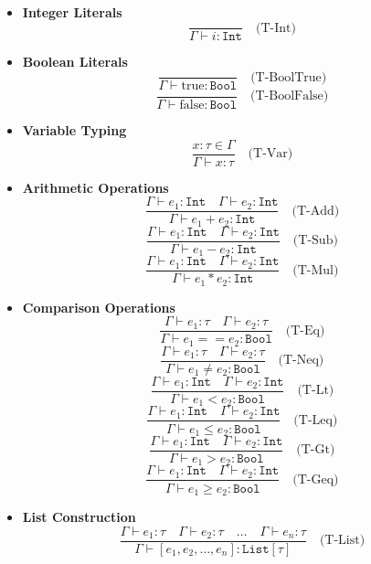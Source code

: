 \documentclass[letterpaper,12pt]{article}
\begin{document}
\begin{itemize}
    \item \textbf{Integer Literals}
    \[
    \frac{}{\Gamma \vdash i : \texttt{Int}} \quad \text{(T-Int)}
    \]
    
    \item \textbf{Boolean Literals}
    \[
    \frac{}{\Gamma \vdash \text{true} : \texttt{Bool}} \quad \text{(T-BoolTrue)}
    \]
    \[
    \frac{}{\Gamma \vdash \text{false} : \texttt{Bool}} \quad \text{(T-BoolFalse)}
    \]
    
    \item \textbf{Variable Typing}
    \[
    \frac{x : \tau \in \Gamma}{\Gamma \vdash x : \tau} \quad \text{(T-Var)}
    \]
    
    \item \textbf{Arithmetic Operations}
    \[
    \frac{\Gamma \vdash e_1 : \texttt{Int} \quad \Gamma \vdash e_2 : \texttt{Int}}{\Gamma \vdash e_1 + e_2 : \texttt{Int}} \quad \text{(T-Add)}
    \]
    \[
    \frac{\Gamma \vdash e_1 : \texttt{Int} \quad \Gamma \vdash e_2 : \texttt{Int}}{\Gamma \vdash e_1 - e_2 : \texttt{Int}} \quad \text{(T-Sub)}
    \]
    \[
    \frac{\Gamma \vdash e_1 : \texttt{Int} \quad \Gamma \vdash e_2 : \texttt{Int}}{\Gamma \vdash e_1 * e_2 : \texttt{Int}} \quad \text{(T-Mul)}
    \]
    
    \item \textbf{Comparison Operations}
    \[
    \frac{\Gamma \vdash e_1 : \tau \quad \Gamma \vdash e_2 : \tau}{\Gamma \vdash e_1 == e_2 : \texttt{Bool}} \quad \text{(T-Eq)}
    \]
    \[
    \frac{\Gamma \vdash e_1 : \tau \quad \Gamma \vdash e_2 : \tau}{\Gamma \vdash e_1 \ne e_2 : \texttt{Bool}} \quad \text{(T-Neq)}
    \]
    \[
    \frac{\Gamma \vdash e_1 : \texttt{Int} \quad \Gamma \vdash e_2 : \texttt{Int}}{\Gamma \vdash e_1 < e_2 : \texttt{Bool}} \quad \text{(T-Lt)}
    \]
    \[
    \frac{\Gamma \vdash e_1 : \texttt{Int} \quad \Gamma \vdash e_2 : \texttt{Int}}{\Gamma \vdash e_1 \leq e_2 : \texttt{Bool}} \quad \text{(T-Leq)}
    \]
    \[
    \frac{\Gamma \vdash e_1 : \texttt{Int} \quad \Gamma \vdash e_2 : \texttt{Int}}{\Gamma \vdash e_1 > e_2 : \texttt{Bool}} \quad \text{(T-Gt)}
    \]
    \[
    \frac{\Gamma \vdash e_1 : \texttt{Int} \quad \Gamma \vdash e_2 : \texttt{Int}}{\Gamma \vdash e_1 \geq e_2 : \texttt{Bool}} \quad \text{(T-Geq)}
    \]
    
    \item \textbf{List Construction}
    \[
    \frac{
        \Gamma \vdash e_1 : \tau \quad \Gamma \vdash e_2 : \tau \quad \dots \quad \Gamma \vdash e_n : \tau
    }{
        \Gamma \vdash [e_1, e_2, \dots, e_n] : \texttt{List}[\tau]
    } \quad \text{(T-List)}
    \]
    

\end{itemize}
\end{document}
